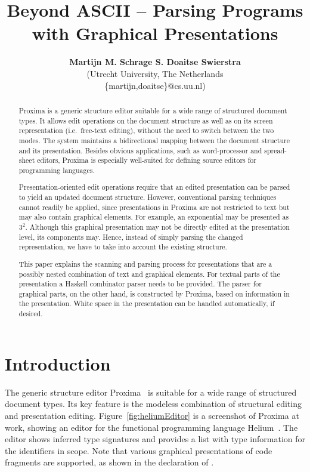 \documentclass{article}[10pt]
\title{Beyond ASCII -- Parsing Programs with Graphical Presentations}
\author{{\bfseries Martijn M. Schrage S. Doaitse Swierstra}\\
   (Utrecht University, The Netherlands\\
   \{martijn,doaitse\}@cs.uu.nl)\\
}
\begin{document}
 

\maketitle

\begin{abstract}

Proxima is a generic structure editor suitable for a wide range of structured document types. It allows edit operations on the document structure as well as on its screen representation (i.e.\ free-text editing), without the need to switch between the two modes. The system maintains a bidirectional mapping between the document structure and its presentation. Besides obvious applications, such as word-processor and spread-sheet editors, Proxima is especially well-suited for defining source editors for programming languages.

Presentation-oriented edit operations require that an edited presentation can be parsed to yield an updated document structure. However, conventional parsing techniques cannot readily be applied, since presentations in Proxima are not restricted to text but may also contain graphical elements. For example, an exponential may be presented as $3^2$. Although this graphical presentation may not be directly edited at the presentation level, its components may. Hence, instead of simply parsing the changed representation, we have to take into account the existing structure. 

This paper explains the scanning and parsing process for presentations that are a possibly nested combination of text and graphical elements. For textual parts of the presentation a Haskell combinator parser needs to be provided. The parser for graphical parts, on the other hand, is constructed by Proxima, based on information in the presentation. White space in the presentation can be handled automatically, if desired. 
\end{abstract}


\section{Introduction}\label{sect:introduction}

The generic structure editor Proxima~\cite{schrage04Proxima} is suitable for a wide range of structured document types. Its key feature is the modeless combination of structural editing and presentation editing. Figure~\ref{fig:heliumEditor} is a screenshot of Proxima at work, showing an editor for the functional programming language Helium~\cite{heeren03helium}. The editor shows inferred type signatures and provides a list with type information for the identifiers in scope. Note that various graphical presentations of code fragments are supported, as shown in the declaration of .
\end{document}
